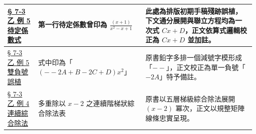 \documentclass[a4paper,12pt,twoside]{article}
\begin{document}
\begin{table}[H]
\begin{tabularx}{\textwidth}{|p{3.0cm}|p{3.8cm}|X|}
\hyperref[note:ch7-cx-plus-d]{§ 7-3 乙 例 5 待定係數式} & 
第一行待定係數曾印為 $\frac{(x+1)}{x^2-x+1}$ & 
此處為排版初期手稿殘跡誤植，下文通分展開與聯立方程均為一次式 $Cx+D$，正文依算式邏輯校正為 $Cx+D$ 並加註。 \\ \hline

\hyperref[note:ch7-double-minus]{§ 7-3 乙 例 5 雙負號誤植} & 
式中印為「$(--2A+B-2C+D)x^2$」 & 
原書鉛字多排一個減號字模形成「$--$」，正文校正為單一負號「$-2A$」特予備註。 \\ \hline

\hyperref[subsec:7-3-b]{§ 7-3 乙 例 4 連續綜合除法} & 
多重除以 $x-2$ 之連續階梯狀綜合除法表 & 
原書以五層梯級綜合除法展開 $(x-2)$ 冪次，正文以規整矩陣線條忠實呈現。 \\ \hline

\end{tabularx}
\end{table}

\clearpage
\tableofcontents
\newpage

\end{document}
